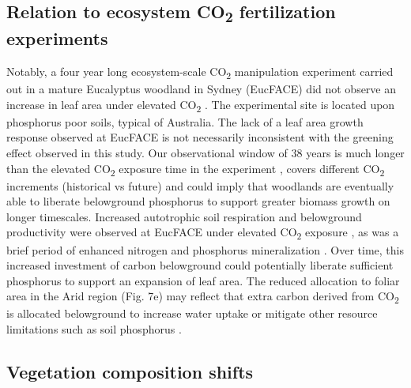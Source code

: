 \documentclass[gc, manuscript]{copernicus}
\begin{document}
\subsection{\texorpdfstring{Relation to ecosystem CO\textsubscript{2}
fertilization
experiments}{Relation to ecosystem CO2 fertilization experiments}}

Notably, a four year long ecosystem-scale CO\textsubscript{2}
manipulation experiment carried out in a mature Eucalyptus woodland in
Sydney (EucFACE) did not observe an increase in leaf area under elevated
CO\textsubscript{2} \citep{jiangFateCarbonMature2020b}. The experimental
site is located upon phosphorus poor soils, typical of Australia. The
lack of a leaf area growth response observed at EucFACE is not
necessarily inconsistent with the greening effect observed in this
study. Our observational window of 38 years is much longer than the
elevated CO\textsubscript{2} exposure time in the experiment \citep[four
years in][]{jiangFateCarbonMature2020b}, covers different
CO\textsubscript{2} increments (historical vs future) and could imply
that woodlands are eventually able to liberate belowground phosphorus to
support greater biomass growth on longer timescales. Increased
autotrophic soil respiration and belowground productivity were observed
at EucFACE under elevated CO\textsubscript{2} exposure
\citep{drakeShorttermCarbonCycling2016, jiangFateCarbonMature2020b}, as
was a brief period of enhanced nitrogen and phosphorus mineralization
\citep{hasegawaElevatedCarbonDioxide2016}. Over time, this increased
investment of carbon belowground could potentially liberate sufficient
phosphorus to support an expansion of leaf area. The reduced allocation
to foliar area in the Arid region (Fig. 7e) may reflect that extra
carbon derived from CO\textsubscript{2} is allocated belowground to
increase water uptake or mitigate other resource limitations such as
soil phosphorus \citep{jiangLowPhosphorusSupply2020}.

\subsection{Vegetation composition shifts}
\end{document}
